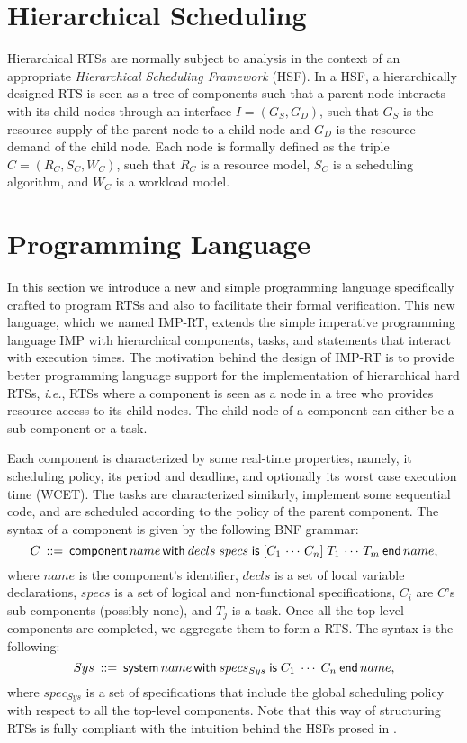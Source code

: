 \documentclass{llncs}
\begin{document}
\section{Hierarchical Scheduling}

Hierarchical RTSs are normally subject to analysis in the context of an appropriate {\em Hierarchical Scheduling Framework} (HSF). In a HSF, a hierarchically designed RTS is seen as a tree of components such that a parent node interacts with its child nodes through an interface $I = (G_S,G_D)$, such that $G_S$ is the resource supply of the parent node to a child node and $G_D$ is the resource demand of the child node. Each node is formally defined as the triple $C = (R_C,S_C,W_C)$, such that $R_C$ is a resource model, $S_C$ is a scheduling algorithm, and $W_C$ is a workload model.

\section{Programming Language}

In this section we introduce a new and simple programming language specifically crafted to program RTSs and also to facilitate their formal verification. This new language, which we named IMP-RT, extends the simple imperative programming language IMP \cite{} with hierarchical components, tasks, and statements that interact with execution times.
The motivation behind the design of IMP-RT is to provide better programming language support for the implementation of hierarchical hard RTSs, {\sl i.e.}, RTSs where a component is seen as a node in a tree who provides resource access to its child nodes. The child node of a component can either be a sub-component or a task. 

Each component is characterized by some real-time properties, namely, it scheduling policy, its period and deadline, and optionally its worst case execution time (WCET). The tasks are characterized similarly, implement some sequential code, and are scheduled according to the policy of the parent component. The syntax of a component is given by the following BNF grammar:
$$
C\:::=\:{\sf component}\,name\,{\sf with}\:decls\;specs\;{\sf is}\;[C_1\,\cdots\,C_n]\;T_1\,\cdots\,T_m\:{\sf end}\,name,
$$
where $name$ is the component's identifier, $decls$ is a set of local variable declarations, $specs$ is a set of logical and non-functional specifications, $C_i$ are $C$'s sub-components (possibly none), and $T_j$ is a task. Once all the top-level components are completed, we aggregate them to form a RTS. The syntax is the following:
$$
Sys\:::=\:{\sf system}\,name\,{\sf with}\:specs_{Sys}\;{\sf is}\;C_1\;\cdots\;C_n\:{\sf end}\,name,
$$
where $spec_{Sys}$ is a set of specifications that include the global scheduling policy with respect to all the top-level components. Note that this way of structuring RTSs is fully compliant with the intuition behind the HSFs prosed in \cite{}.
\end{document}
